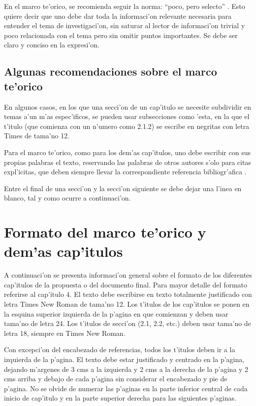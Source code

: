 En el marco te'orico, se recomienda seguir la norma: ``poco, pero selecto'' \cite{Demo:comunicacion}. Esto quiere decir que uno debe dar toda la informaci'on relevante necesaria para entender el tema de investigaci'on, sin saturar al lector de informaci'on trivial y poco relacionada con el tema pero sin omitir puntos importantes. Se debe ser claro y conciso en la expresi'on.

\subsection{Algunas recomendaciones sobre el marco te'orico}
\noindent
En algunos casos, en los que una secci'on de un cap'itulo se necesite subdividir en temas a'un m'as espec'ificos, se pueden usar subsecciones como 'esta, en la que el t'itulo (que comienza con un n'umero como 2.1.2) se escribe en negritas con letra Times de tama'no 12.

Para el marco te'orico, como para los dem'as cap'itulos, uno debe escribir con sus propias palabras el texto, reservando las palabras de otros autores s'olo para citas expl'icitas, que deben siempre llevar la correspondiente referencia bibliogr'afica \cite{Demo:tesis_autor}.

Entre el final de una secci'on y la secci'on siguiente se debe dejar una l'inea en blanco, tal y como ocurre a continuaci'on.

\section{Formato del marco te'orico y dem'as cap'itulos}
\noindent
A continuaci'on se presenta informaci'on general sobre el formato de los diferentes cap'itulos de la propuesta o del documento final. Para mayor detalle del formato referirse al cap'itulo 4. El texto debe escribirse en texto totalmente justificado con letra Times New Roman de tama'no 12. Los t'itulos de los cap'itulos se ponen en la esquina superior izquierda de la p'agina en que comienzan y deben usar tama'no de letra 24. Los t'itulos de secci'on (2.1, 2.2, etc.) deben usar tama'no de letra 18, siempre en Times New Roman.

Con excepci'on del encabezado de referencias, todos los t'itulos deben ir a la izquierda de la p'agina. El texto debe estar justificado y centrado en la p'agina, dejando m'argenes de 3 cms a la izquierda y 2 cms a la derecha de la p'agina y 2 cms arriba y debajo de cada p'agina sin considerar el encabezado y pie de p'agina. No se olvide de numerar las p'aginas en la parte inferior central de cada inicio de cap'itulo y en la parte superior derecha para las siguientes p'aginas.


\clearpage
